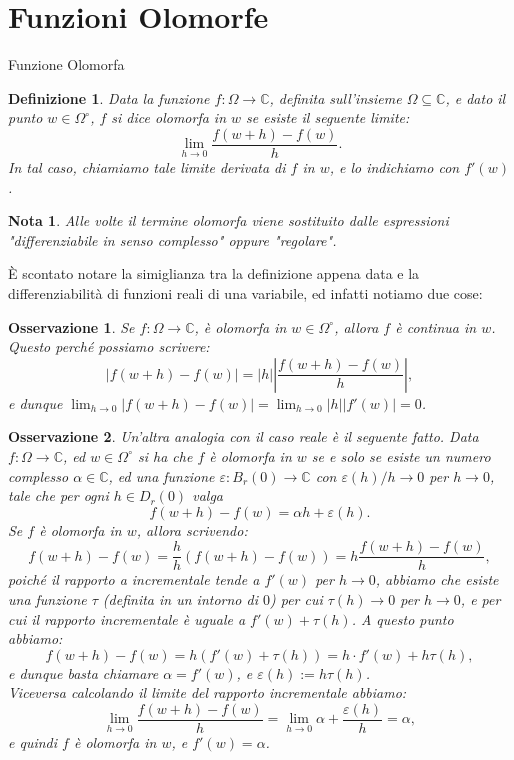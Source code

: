\documentclass[11pt]{book}
\theoremstyle{Definizione}
\newtheorem*{mydef}{Definizione}
\theoremstyle{TeoremaProposizioneLemmaCorollarioCongettura}
\theoremstyle{OsservazioneNotaEsempio}
\newtheorem{myobs}{Osservazione}[section]
\newtheorem*{mynota}{Nota}
\newcommand{\C}{\mathbb{C}}
\newcommand{\Ball}[3][]{B^{#1}_{{#2}}\left({#3}\right)}
\newcommand{\Disc}[3][]{D^{#1}_{{#2}}({#3})}
\begin{document}
\section{Funzioni Olomorfe}
\begin{boxdef}{Funzione Olomorfa}
\begin{mydef}
Data la funzione $f:\Omega\longrightarrow \C$, definita sull'insieme $\Omega\subseteq \C$, e dato il punto $w\in \Omega^\circ$, $f$ si dice olomorfa in $w$ se esiste il seguente limite:
$$
\lim_{h\to 0} \frac{f(w+h)-f(w)}{h}.
$$
In tal caso, chiamiamo tale limite derivata di $f$ in $w$, e lo indichiamo con $f'(w)$.
\end{mydef}
\end{boxdef}
\begin{mynota}
Alle volte il termine olomorfa viene sostituito dalle espressioni "differenziabile in senso complesso" oppure "regolare".
\end{mynota}
È scontato notare la simiglianza tra la definizione appena data e la differenziabilità di funzioni reali di una variabile, ed infatti notiamo due cose:
\begin{myobs}
Se $f:\Omega \longrightarrow \C$, è olomorfa in $w\in \Omega^\circ$, allora $f$ è continua in $w$.\\
Questo perché possiamo scrivere:
$$
|f(w+h)-f(w)| = |h| \left|\frac{f(w+h)-f(w)}{h}\right|,
$$
e dunque $\lim_{h \to 0} |f(w+h)-f(w)| = \lim_{h \to 0} |h||f'(w)| = 0$.
\end{myobs}
\begin{myobs}
Un'altra analogia con il caso reale è il seguente fatto. Data $f:\Omega \longrightarrow \C$, ed $w\in \Omega^\circ$ si ha che $f$ è olomorfa in $w$ se e solo se esiste un numero complesso $\alpha\in \C$, ed una funzione $\varepsilon:\Ball{r}{0}\longrightarrow \C$ con $\varepsilon(h)/h \to 0$ per $h \to 0$, tale che per ogni $h\in \Disc{r}{0}$ valga 
\begin{equation}\label{eq:FunzioneOlomorfaOPiccolo}
f(w+h)-f(w) = \alpha h + \varepsilon(h).
\end{equation}
Se $f$ è olomorfa in $w$, allora scrivendo:
$$
f(w+h)-f(w) = \frac{h}{h}(f(w+h)-f(w)) = h \frac{f(w+h)-f(w)}{h},
$$
poiché il rapporto a incrementale tende a $f'(w)$ per $h \to 0$, abbiamo che esiste una funzione $\tau$ (definita in un intorno di $0$) per cui $\tau(h) \to 0$ per $h \to 0$, e per cui il rapporto incrementale è uguale a $f'(w) + \tau(h)$. A questo punto abbiamo:
$$
f(w+h)-f(w) = h(f'(w)+\tau(h)) = h \cdot f'(w) + h\tau(h),
$$
e dunque basta chiamare $\alpha = f'(w)$, e $\varepsilon(h) := h\tau(h)$.\\
Viceversa calcolando il limite del rapporto incrementale abbiamo:
$$
\lim_{h \to 0} \frac{f(w+h)-f(w)}{h} = \lim_{h \to 0} \alpha + \frac{\varepsilon(h)}{h} = \alpha,
$$
e quindi $f$ è olomorfa in $w$, e $f'(w) = \alpha$. 
\end{myobs}
\end{document}
